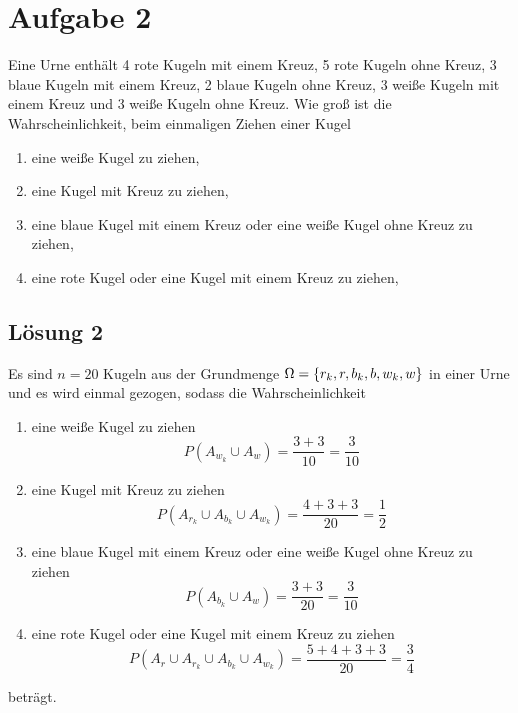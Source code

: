 \documentclass[main.tex]{subfiles}
\begin{document}
\section{Aufgabe 2}
Eine Urne enthält 4 rote Kugeln mit einem Kreuz, 5 rote Kugeln ohne Kreuz, 3 blaue Kugeln mit einem Kreuz, 2 blaue Kugeln ohne Kreuz, 3 weiße Kugeln mit einem Kreuz und 3 weiße Kugeln ohne Kreuz.
Wie groß ist die Wahrscheinlichkeit, beim einmaligen Ziehen einer Kugel
\begin{enumerate}
    \item eine weiße Kugel zu ziehen,
    \item eine Kugel mit Kreuz zu ziehen,
    \item eine blaue Kugel mit einem Kreuz oder eine weiße Kugel ohne Kreuz zu ziehen,
    \item eine rote Kugel oder eine Kugel mit einem Kreuz zu ziehen,
\end{enumerate}

\subsection{Lösung 2}
Es sind $n = 20$ Kugeln aus der Grundmenge $\Omega = \set*{r_k, r, b_k, b, w_k, w}$ in einer Urne und es wird einmal gezogen, sodass die Wahrscheinlichkeit
\begin{enumerate}
    \item eine weiße Kugel zu ziehen $$
        P(A_{w_k} \cup A_{w}) = \frac{3+3}{10} = \frac{3}{10}
    $$
    \item eine Kugel mit Kreuz zu ziehen $$
        P(A_{r_k} \cup A_{b_k} \cup A_{w_k}) = \frac{4+3+3}{20} = \frac{1}{2}
    $$
    \item eine blaue Kugel mit einem Kreuz oder eine weiße Kugel ohne Kreuz zu ziehen $$
        P(A_{b_k} \cup A_{w}) = \frac{3+3}{20} = \frac{3}{10}
    $$
    \item eine rote Kugel oder eine Kugel mit einem Kreuz zu ziehen $$
        P(A_{r} \cup A_{r_k} \cup A_{b_k} \cup A_{w_k}) = \frac{5 + 4 + 3 + 3}{20} = \frac{3}{4}
    $$
\end{enumerate}
beträgt.
\end{document}
